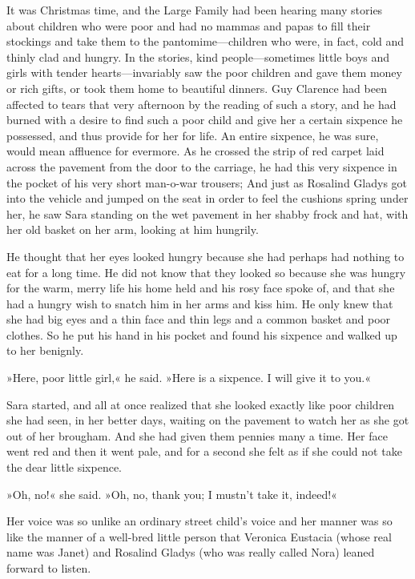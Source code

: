 It was Christmas time, and the Large Family had been hearing many stories about children who were poor and had no mammas and papas to fill their stockings and take them to the pantomime—children who were, in fact, cold and thinly clad and hungry. In the stories, kind people—sometimes little boys and girls with tender hearts—invariably saw the poor children and gave them money or rich gifts, or took them home to beautiful dinners. Guy Clarence had been affected to tears that very afternoon by the reading of such a story, and he had burned with a desire to find such a poor child and give her a certain sixpence he possessed, and thus provide for her for life. An entire sixpence, he was sure, would mean affluence for evermore. As he crossed the strip of red carpet laid across the pavement from the door to the carriage, he had this very sixpence in the pocket of his very short man-o-war trousers; And just as Rosalind Gladys got into the vehicle and jumped on the seat in order to feel the cushions spring under her, he saw Sara standing on the wet pavement in her shabby frock and hat, with her old basket on her arm, looking at him hungrily.

He thought that her eyes looked hungry because she had perhaps had nothing to eat for a long time. He did not know that they looked so because she was hungry for the warm, merry life his home held and his rosy face spoke of, and that she had a hungry wish to snatch him in her arms and kiss him. He only knew that she had big eyes and a thin face and thin legs and a common basket and poor clothes. So he put his hand in his pocket and found his sixpence and walked up to her benignly.

»Here, poor little girl,« he said. »Here is a sixpence. I will give it to you.«

Sara started, and all at once realized that she looked exactly like poor children she had seen, in her better days, waiting on the pavement to watch her as she got out of her brougham. And she had given them pennies many a time. Her face went red and then it went pale, and for a second she felt as if she could not take the dear little sixpence.

»Oh, no!« she said. »Oh, no, thank you; I mustn't take it, indeed!«

Her voice was so unlike an ordinary street child's voice and her manner was so like the manner of a well-bred little person that Veronica Eustacia (whose real name was Janet) and Rosalind Gladys (who was really called Nora) leaned forward to listen.

